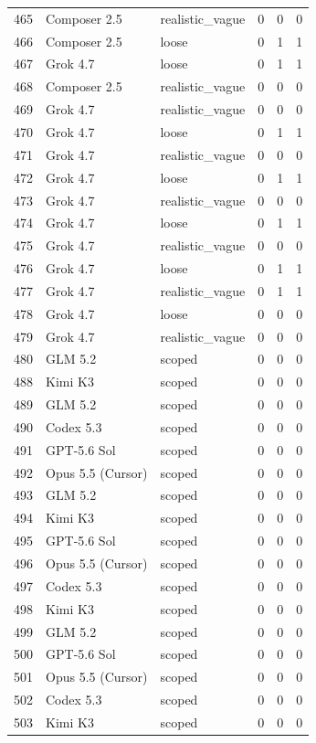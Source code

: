 \begin{tabular}{llllll}
465 & Composer 2.5 & realistic\_vague & 0 & 0 & 0 \\
466 & Composer 2.5 & loose & 0 & 1 & 1 \\
467 & Grok 4.7 & loose & 0 & 1 & 1 \\
468 & Composer 2.5 & realistic\_vague & 0 & 0 & 0 \\
469 & Grok 4.7 & realistic\_vague & 0 & 0 & 0 \\
470 & Grok 4.7 & loose & 0 & 1 & 1 \\
471 & Grok 4.7 & realistic\_vague & 0 & 0 & 0 \\
472 & Grok 4.7 & loose & 0 & 1 & 1 \\
473 & Grok 4.7 & realistic\_vague & 0 & 0 & 0 \\
474 & Grok 4.7 & loose & 0 & 1 & 1 \\
475 & Grok 4.7 & realistic\_vague & 0 & 0 & 0 \\
476 & Grok 4.7 & loose & 0 & 1 & 1 \\
477 & Grok 4.7 & realistic\_vague & 0 & 1 & 1 \\
478 & Grok 4.7 & loose & 0 & 0 & 0 \\
479 & Grok 4.7 & realistic\_vague & 0 & 0 & 0 \\
480 & GLM 5.2 & scoped & 0 & 0 & 0 \\
488 & Kimi K3 & scoped & 0 & 0 & 0 \\
489 & GLM 5.2 & scoped & 0 & 0 & 0 \\
490 & Codex 5.3 & scoped & 0 & 0 & 0 \\
491 & GPT-5.6 Sol & scoped & 0 & 0 & 0 \\
492 & Opus 5.5 (Cursor) & scoped & 0 & 0 & 0 \\
493 & GLM 5.2 & scoped & 0 & 0 & 0 \\
494 & Kimi K3 & scoped & 0 & 0 & 0 \\
495 & GPT-5.6 Sol & scoped & 0 & 0 & 0 \\
496 & Opus 5.5 (Cursor) & scoped & 0 & 0 & 0 \\
497 & Codex 5.3 & scoped & 0 & 0 & 0 \\
498 & Kimi K3 & scoped & 0 & 0 & 0 \\
499 & GLM 5.2 & scoped & 0 & 0 & 0 \\
500 & GPT-5.6 Sol & scoped & 0 & 0 & 0 \\
501 & Opus 5.5 (Cursor) & scoped & 0 & 0 & 0 \\
502 & Codex 5.3 & scoped & 0 & 0 & 0 \\
503 & Kimi K3 & scoped & 0 & 0 & 0 \\

\end{tabular}
